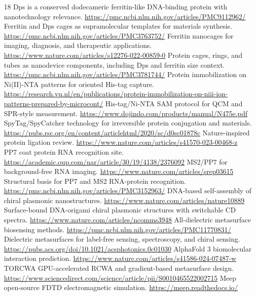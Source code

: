 \documentclass[11pt]{article}
\begin{document}
\begin{thebibliography}{18}
 Dps is a conserved dodecameric ferritin-like DNA-binding protein with nanotechnology relevance. \url{https://pmc.ncbi.nlm.nih.gov/articles/PMC9112962/}
 Ferritin and Dps cages as supramolecular templates for materials synthesis. \url{https://pmc.ncbi.nlm.nih.gov/articles/PMC3763752/}
 Ferritin nanocages for imaging, diagnosis, and therapeutic applications. \url{https://www.nature.com/articles/s12276-022-00859-0}
 Protein cages, rings, and tubes as nanodevice components, including Dps and ferritin size context. \url{https://pmc.ncbi.nlm.nih.gov/articles/PMC3781744/}
 Protein immobilization on Ni(II)-NTA patterns for oriented His-tag capture. \url{https://research.vu.nl/en/publications/protein-immobilization-on-niii-ion-patterns-prepared-by-microcont/}
 His-tag/Ni-NTA SAM protocol for QCM and SPR-style measurement. \url{https://www.dojindo.com/products/manual/N475e.pdf}
 SpyTag/SpyCatcher technology for irreversible protein conjugation and materials. \url{https://pubs.rsc.org/en/content/articlehtml/2020/sc/d0sc01878c}
 Nature-inspired protein ligation review. \url{https://www.nature.com/articles/s41570-023-00468-z}
 PP7 coat protein RNA recognition site. \url{https://academic.oup.com/nar/article/30/19/4138/2376092}
 MS2/PP7 for background-free RNA imaging. \url{https://www.nature.com/articles/srep03615}
 Structural basis for PP7 and MS2 RNA-protein recognition. \url{https://pmc.ncbi.nlm.nih.gov/articles/PMC3152963/}
 DNA-based self-assembly of chiral plasmonic nanostructures. \url{https://www.nature.com/articles/nature10889}
 Surface-bound DNA-origami chiral plasmonic structures with switchable CD spectra. \url{https://www.nature.com/articles/ncomms3948}
 All-dielectric metasurface biosensing methods. \url{https://pmc.ncbi.nlm.nih.gov/articles/PMC11770831/}
 Dielectric metasurfaces for label-free sensing, spectroscopy, and chiral sensing. \url{https://pubs.acs.org/doi/10.1021/acsphotonics.0c01030}
 AlphaFold 3 biomolecular interaction prediction. \url{https://www.nature.com/articles/s41586-024-07487-w}
 TORCWA GPU-accelerated RCWA and gradient-based metasurface design. \url{https://www.sciencedirect.com/science/article/pii/S0010465522002715}
 Meep open-source FDTD electromagnetic simulation. \url{https://meep.readthedocs.io/}
\end{thebibliography}
\end{document}
